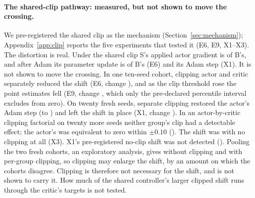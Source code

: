 \paragraph{The shared-clip pathway: measured, but not shown to move the crossing.}
We pre-registered the shared clip as the mechanism (Section~\ref{sec:mechanism}); Appendix~\ref{app:clip} reports the
five experiments that tested it (E6, E9, X1--X3). The distortion is real. Under the shared clip S's applied actor
gradient is \VsixGradGlobal{} of B's, and after Adam its parameter update is \VsixUpdGlobal{} of B's (E6) and its Adam
step \VxoGlobStep{} (X1). It is not shown to move the crossing. In one ten-seed cohort, clipping actor and critic
separately reduced the shift (E6, change \VjtChSix{}), and as the clip threshold rose the point
estimates fell (E9, change \VjtChNineDose{}, which only the pre-declared percentile interval excludes from zero). On
twenty fresh seeds, separate clipping restored the actor's Adam step (to \VxoGroupStep{}) and left the shift in place
(X1, change \VxFCh{}). In an actor-by-critic clipping factorial on twenty more seeds neither group's clip had a
detectable effect; the actor's was equivalent to zero within $\pm0.10$ (\VxtAEff{}). The shift was \VxtNeither{}
with no clipping at all (X3). X1's pre-registered no-clip shift was not detected (\VxFNone{}). Pooling the two fresh
cohorts, an exploratory analysis, gives \VxeNone{} without clipping and \VxeGroup{} with per-group clipping, so clipping
may enlarge the shift, by an amount on which the cohorts disagree. Clipping is therefore not necessary for the shift,
and is not shown to carry it. How much of the shared controller's larger clipped shift runs through the critic's
targets is not tested.

